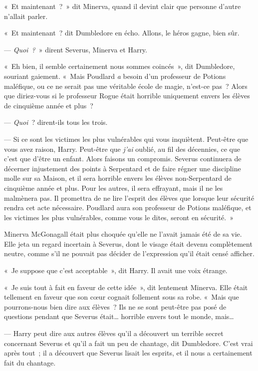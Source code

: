 «~Et maintenant~?~»
dit Minerva, quand il devint clair que personne d'autre n'allait parler.

«~Et maintenant~? dit Dumbledore en écho.
Allons, le héros gagne, bien sûr.

--- \emph{Quoi~?}~» dirent Severus, Minerva et Harry.

«~Eh bien, il semble certainement nous sommes coincés~», dit Dumbledore, souriant gaiement.
«~Mais Poudlard \emph{a} besoin d'un professeur de Potions maléfique, ou ce ne serait pas une véritable école de magie, n'est-ce pas~?
Alors que diriez-vous si le professeur Rogue était horrible uniquement envers les élèves de cinquième année et plus~?

--- \emph{Quoi}~? dirent-ils tous les trois.

--- Si ce sont les victimes les plus vulnérables qui vous inquiètent.
Peut-être que vous avez raison, Harry.
Peut-être que \emph{j'ai} oublié, au fil des décennies, ce que c'est que d'être un enfant.
Alors faisons un compromis.
Severus continuera de décerner injustement des points à Serpentard et de faire régner une discipline molle sur sa Maison, et il sera horrible envers les élèves non-Serpentard de cinquième année et plus.
Pour les autres, il sera effrayant, mais il ne les malmènera pas.
Il promettra de ne lire l'esprit des élèves que lorsque leur sécurité rendra cet acte nécessaire.
Poudlard aura son professeur de Potions maléfique, et les victimes les plus vulnérables, comme vous le dites, seront en sécurité.~»

Minerva McGonagall était plus choquée qu'elle ne l'avait jamais été de sa vie.
Elle jeta un regard incertain à Severus, dont le visage était devenu complètement neutre, comme s'il ne pouvait pas décider de l'expression qu'il était censé afficher.

«~Je suppose que c'est acceptable~», dit Harry.
Il avait une voix étrange.

«~Je suis tout à fait en faveur de cette idée~», dit lentement Minerva.
Elle était tellement en faveur que son cœur cognait follement sous sa robe.
«~Mais que pourrons-nous bien dire aux élèves~?
Ils ne se sont peut-être pas posé de questions pendant que Severus était… horrible envers tout le monde, mais…

--- Harry peut dire aux autres élèves qu'il a découvert un terrible secret concernant Severus et qu'il a fait un peu de chantage, dit Dumbledore.
C'est vrai après tout~; il a découvert que Severus lisait les esprits, et il nous a certainement fait du chantage.


